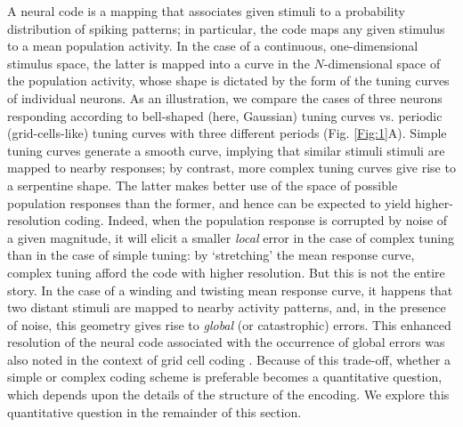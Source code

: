 \documentclass[a4paper]{article}%
\begin{document}
A neural code is a mapping that associates given stimuli to a probability
distribution of spiking patterns; in particular, the code maps any given
stimulus to a mean population activity. In the case of a continuous,
one-dimensional stimulus space, the latter is mapped into a curve in the
$N$-dimensional space of the population activity, whose shape is dictated by
the form of the tuning curves of individual neurons. As an illustration, we
compare the cases of three neurons responding according to bell-shaped (here,
Gaussian) tuning curves vs. periodic (grid-cells-like) tuning curves with
three different periods (Fig. \ref{Fig:1}A). Simple tuning
curves generate a smooth curve, implying that similar stimuli stimuli are
mapped to nearby responses; by contrast, more complex tuning curves give rise
to a serpentine shape. The latter makes better use of the space of possible
population responses than the former, and hence can be expected to yield
higher-resolution coding. Indeed, when the population response is corrupted by
noise of a given magnitude, it will elicit a smaller \textit{local} error in
the case of complex tuning than in the case of simple tuning: by `stretching'
the mean response curve, complex tuning afford the code with higher
resolution. But this is not the entire story. In the case of a winding and
twisting mean response curve, it happens that two distant stimuli are mapped
to nearby activity patterns, and, in the presence of noise, this geometry
gives rise to \textit{global} (or catastrophic) errors. This enhanced resolution of
the neural code associated with the occurrence of global errors was also noted
in the context of grid cell coding \cite[]{Sreenivasan2011GridComputation}.
Because of this trade-off, whether a simple or complex coding scheme is
preferable becomes a quantitative question, which depends upon the details of
the structure of the encoding. We explore this quantitative question in the
remainder of this section.
\end{document}

